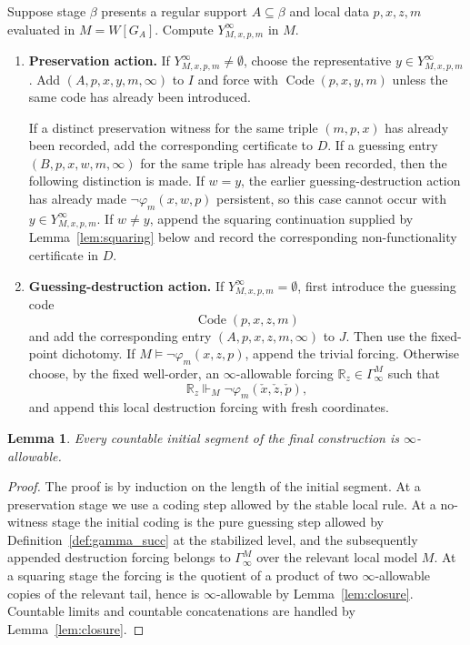 \documentclass{article}
\newtheorem{lemma}[theorem]{Lemma}
\theoremstyle{remark}
\theoremstyle{plain}
\newcommand{\forceR}{\mathbb{R}}
\newcommand{\Code}{\operatorname{Code}}
\begin{document}
Suppose stage $\beta$ presents a regular support $A\subseteq\beta$ and local data
$p,x,z,m$ evaluated in $M=W[G_A]$. Compute $Y^\infty_{M,x,p,m}$ in $M$.

\begin{enumerate}[label=\textup{(\Alph*)}]
\item \textbf{Preservation action.}
If $Y^\infty_{M,x,p,m}\neq\emptyset$, choose the representative
$y\in Y^\infty_{M,x,p,m}$. Add $(A,p,x,y,m,\infty)$ to $I$ and force with
$\Code(p,x,y,m)$ unless the same code has already been introduced.

If a distinct preservation witness for the same triple $(m,p,x)$ has already
been recorded, add the corresponding certificate to $D$. If a guessing entry
$(B,p,x,w,m,\infty)$ for the same triple has already been recorded, then the
following distinction is made. If $w=y$, the earlier guessing-destruction action
has already made $\neg\varphi_m(x,w,p)$ persistent, so this case cannot occur
with $y\in Y^\infty_{M,x,p,m}$. If $w\neq y$, append the squaring continuation
supplied by Lemma~\ref{lem:squaring} below and record the corresponding
non-functionality certificate in $D$.

\item \textbf{Guessing-destruction action.}
If $Y^\infty_{M,x,p,m}=\emptyset$, first introduce the guessing code
\[
   \Code(p,x,z,m)
\]
and add the corresponding entry $(A,p,x,z,m,\infty)$ to $J$. Then use the
fixed-point dichotomy. If $M\models\neg\varphi_m(x,z,p)$, append the trivial
forcing. Otherwise choose, by the fixed well-order, an $\infty$-allowable
forcing $\forceR_z\in\Gamma^M_\infty$ such that
\[
   \forceR_z\Vdash_M\neg\varphi_m(\check x,\check z,\check p),
\]
and append this local destruction forcing with fresh coordinates.
\end{enumerate}

\begin{lemma}\label{lem:final-initial-segments}
Every countable initial segment of the final construction is $\infty$-allowable.
\end{lemma}

\begin{proof}
The proof is by induction on the length of the initial segment. At a
preservation stage we use a coding step allowed by the stable local rule. At a
no-witness stage the initial coding is the pure guessing step allowed by
Definition~\ref{def:gamma_succ} at the stabilized level, and the subsequently
appended destruction forcing belongs to $\Gamma^M_\infty$ over the relevant local
model $M$. At a squaring stage the forcing is the quotient of a product of two
$\infty$-allowable copies of the relevant tail, hence is $\infty$-allowable by
Lemma~\ref{lem:closure}. Countable limits and countable concatenations are
handled by Lemma~\ref{lem:closure}.
\end{proof}
\end{document}
